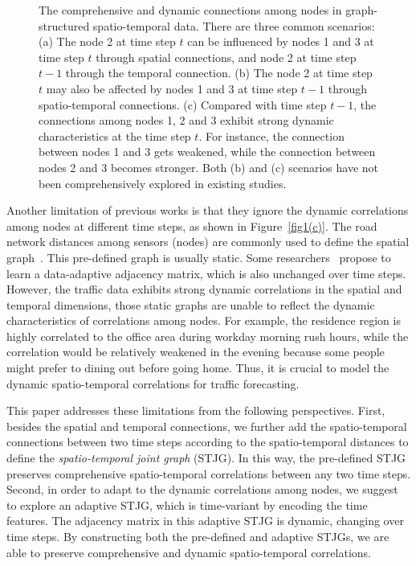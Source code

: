 \documentclass[10pt,journal,compsoc]{IEEEtran}
\begin{document}
\begin{figure*}
	\centering
		\hspace{10pt}		
		\hspace{10pt}
	\caption{The comprehensive and dynamic connections among nodes in graph-structured spatio-temporal data. There are three common scenarios: (a) The node 2 at time step $ t $ can be influenced by nodes 1 and 3 at time step $ t $ through spatial connections, and node 2 at time step $ t-1 $ through the temporal connection. (b) The node 2 at time step $ t $ may also be affected by nodes 1 and 3 at time step $ t-1 $ through spatio-temporal connections. (c) Compared with time step $ t-1 $, the connections among nodes 1, 2 and 3 exhibit strong dynamic characteristics at the time step $ t $. For instance, the connection between nodes 1 and 3 gets weakened, while the connection between nodes 2 and 3 becomes stronger. Both (b) and (c) scenarios have not been comprehensively explored in existing studies.}
	\label{fig1}
\end{figure*}

Another limitation of previous works is that they ignore the dynamic correlations among nodes at different time steps, as shown in Figure~\ref{fig1(c)}. The road network distances among sensors (nodes) are commonly used to define the spatial graph~\cite{Li-et-al:ICLR2018,Yu-et-al:IJCAI2018}. This pre-defined graph is usually static. Some researchers~\cite{Wu-et-al:IJCAI2019,Bai-et-al:NIPS2020} propose to learn a data-adaptive adjacency matrix, which is also unchanged over time steps. However, the traffic data exhibits strong dynamic correlations in the spatial and temporal dimensions, those static graphs are unable to reflect the dynamic characteristics of correlations among nodes. For example, the residence region is highly correlated to the office area during workday morning rush hours, while the correlation would be relatively weakened in the evening because some people might prefer to dining out before going home. Thus, it is crucial to model the dynamic spatio-temporal correlations for traffic forecasting.   

This paper addresses these limitations from the following perspectives. First, besides the spatial and temporal connections, we further add the spatio-temporal connections between two time steps according to the spatio-temporal distances to define the \textit{spatio-temporal joint graph} (STJG). In this way, the pre-defined STJG preserves comprehensive spatio-temporal correlations between any two time steps. Second, in order to adapt to the dynamic correlations among nodes, we suggest to explore an adaptive STJG, which is time-variant by encoding the time features. The adjacency matrix in this adaptive STJG is dynamic, changing over time steps. By constructing both the pre-defined and adaptive STJGs, we are able to preserve comprehensive and dynamic spatio-temporal correlations.
\end{document}

